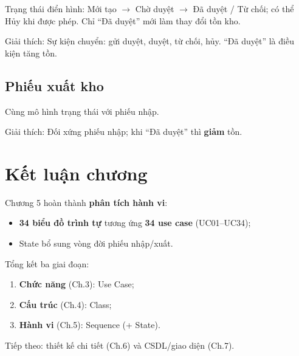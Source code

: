 Trạng thái điển hình: Mới tạo $\rightarrow$ Chờ duyệt $\rightarrow$ Đã duyệt / Từ chối; có thể Hủy khi được phép. Chỉ ``Đã duyệt'' mới làm thay đổi tồn kho.



Giải thích: Sự kiện chuyển: gửi duyệt, duyệt, từ chối, hủy. ``Đã duyệt'' là điều kiện tăng tồn.

\subsection{Phiếu xuất kho}

Cùng mô hình trạng thái với phiếu nhập.



Giải thích: Đối xứng phiếu nhập; khi ``Đã duyệt'' thì \textbf{giảm} tồn.

\section{Kết luận chương}

Chương 5 hoàn thành \textbf{phân tích hành vi}:
\begin{itemize}[leftmargin=1.5cm]
    \item \textbf{34 biểu đồ trình tự} tương ứng \textbf{34 use case} (UC01--UC34);
    \item State bổ sung vòng đời phiếu nhập/xuất.
\end{itemize}

Tổng kết ba giai đoạn:
\begin{enumerate}[leftmargin=1.5cm]
    \item \textbf{Chức năng} (Ch.3): Use Case;
    \item \textbf{Cấu trúc} (Ch.4): Class;
    \item \textbf{Hành vi} (Ch.5): Sequence (+ State).
\end{enumerate}

Tiếp theo: thiết kế chi tiết (Ch.6) và CSDL/giao diện (Ch.7).
